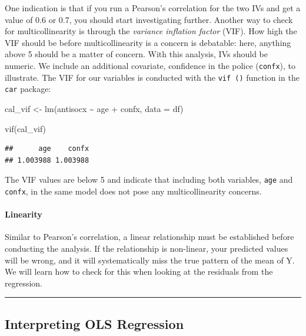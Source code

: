 \documentclass[
]{book}
\newenvironment{Shaded}{\begin{snugshade}}{\end{snugshade}}
\newcommand{\AttributeTok}[1]{\textcolor[rgb]{0.77,0.63,0.00}{#1}}
\newcommand{\FunctionTok}[1]{\textcolor[rgb]{0.00,0.00,0.00}{#1}}
\newcommand{\NormalTok}[1]{#1}
\newcommand{\OtherTok}[1]{\textcolor[rgb]{0.56,0.35,0.01}{#1}}
\newcommand{\SpecialCharTok}[1]{\textcolor[rgb]{0.00,0.00,0.00}{#1}}
\begin{document}
One indication is that if you run a Pearson's correlation for the two IVs and get a value of 0.6 or 0.7, you should start investigating further. Another way to check for multicollinearity is through the \emph{variance inflation factor} (VIF). How high the VIF should be before multicollinearity is a concern is debatable: here, anything above 5 should be a matter of concern. With this analysis, IVs should be numeric. We include an additional covariate, confidence in the police (\texttt{confx}), to illustrate. The VIF for our variables is conducted with the \texttt{vif\ ()} function in the \texttt{car} package:

\begin{Shaded}
\begin{Highlighting}[]
\NormalTok{cal\_vif }\OtherTok{\textless{}{-}} \FunctionTok{lm}\NormalTok{(antisocx }\SpecialCharTok{\textasciitilde{}}\NormalTok{ age }\SpecialCharTok{+}\NormalTok{ confx, }\AttributeTok{data =}\NormalTok{ df) }

\FunctionTok{vif}\NormalTok{(cal\_vif)}
\end{Highlighting}
\end{Shaded}

\begin{verbatim}
##      age    confx 
## 1.003988 1.003988
\end{verbatim}

The VIF values are below 5 and indicate that including both variables, \texttt{age} and \texttt{confx}, in the same model does not pose any multicollinearity concerns.

\hypertarget{linearity}{%
\paragraph{Linearity}\label{linearity}}

Similar to Pearson's correlation, a linear relationship must be established before conducting the analysis. If the relationship is non-linear, your predicted values will be wrong, and it will systematically miss the true pattern of the mean of Y. We will learn how to check for this when looking at the residuals from the regression.

\begin{center}\rule{0.5\linewidth}{0.5pt}\end{center}

\hypertarget{interpreting-ols-regression}{%
\subsection{Interpreting OLS Regression}\label{interpreting-ols-regression}}
\end{document}
